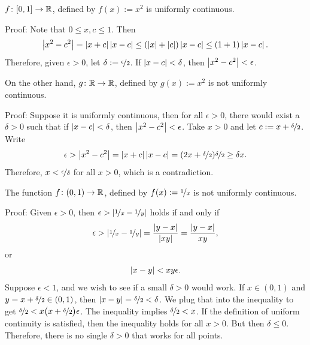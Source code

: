 \begin{example}
$f \colon [0,1] \to {\mathbb{R}}$, defined by $f(x) := x^2$ is uniformly continuous.

Proof: Note that $0 \leq x,c \leq 1$.  Then
\begin{equation*}
\left\lvert {x^2-c^2} \right\rvert = \left\lvert {x+c} \right\rvert\left\lvert {x-c} \right\rvert
\leq (\left\lvert {x} \right\rvert+\left\lvert {c} \right\rvert) \left\lvert {x-c} \right\rvert
\leq (1+1)\left\lvert {x-c} \right\rvert .
\end{equation*}
Therefore, given $\epsilon > 0$, let $\delta := \nicefrac{\epsilon}{2}$.
If $\left\lvert {x-c} \right\rvert < \delta$, then $\left\lvert {x^2-c^2} \right\rvert < \epsilon$.

\medskip

On the other hand, $g \colon {\mathbb{R}} \to {\mathbb{R}}$, defined by $g(x) := x^2$ is not uniformly
continuous.

Proof: Suppose it is uniformly continuous, then for all $\epsilon > 0$,
there would exist a $\delta > 0$ such that
if $\left\lvert {x-c} \right\rvert < \delta$, then $\left\lvert {x^2 -c^2} \right\rvert < \epsilon$.
Take $x > 0$ and let
$c := x+\nicefrac{\delta}{2}$.  Write
\begin{equation*}
\epsilon >
\left\lvert {x^2-c^2} \right\rvert = \left\lvert {x+c} \right\rvert\left\lvert {x-c} \right\rvert
=
(2x+\nicefrac{\delta}{2})\nicefrac{\delta}{2} 
\geq 
\delta x .
\end{equation*}
Therefore, $x < \nicefrac{\epsilon}{\delta}$ for all $x > 0$, which is a
contradiction.
\end{example}


\begin{example}
The function $f \colon (0,1) \to {\mathbb{R}}$, defined by $f(x) := \nicefrac{1}{x}$ is not
uniformly continuous.

Proof: Given $\epsilon > 0$, then $\epsilon >
\left\lvert {\nicefrac{1}{x}-\nicefrac{1}{y}} \right\rvert$ holds if and only if
\begin{equation*}
\epsilon >
\left\lvert {\nicefrac{1}{x}-\nicefrac{1}{y}} \right\rvert
=
\frac{\left\lvert {y-x} \right\rvert}{\left\lvert {xy} \right\rvert} 
=
\frac{\left\lvert {y-x} \right\rvert}{xy} ,
\end{equation*}
or
\begin{equation*}
\left\lvert {x-y} \right\rvert < xy \epsilon .
\end{equation*}
Suppose $\epsilon < 1$, and we wish to see if a 
small $\delta > 0$ would work.
If $x \in (0,1)$ and 
$y = x+\nicefrac{\delta}{2} \in (0,1)$,
then $\left\lvert {x-y} \right\rvert = \nicefrac{\delta}{2} < \delta$.
We plug that into the inequality to get $\nicefrac{\delta}{2} <
x \bigl( x+\nicefrac{\delta}{2} \bigr) \epsilon$.
The inequality implies $\nicefrac{\delta}{2} < x$.
If the definition of uniform continuity is satisfied, then
the inequality holds for all $x > 0$.   But then $\delta \leq 0$.
Therefore, there is no single $\delta > 0$ that works for all points.
\end{example}

